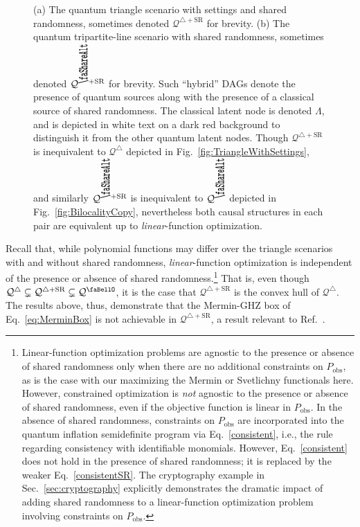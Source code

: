 \documentclass[superscriptaddress,aps,prx,nofootinbib,twocolumn,twoside,reprint,letterpaper,longbibliography]{revtex4-2}
\renewcommand{\bell}{\text{\faBellO}}
\renewcommand{\triangle}{\bigtriangleup}
\newcommand{\biloc}{\text{\scalebox{2}[1]{\rotatebox{90}{\faShareAlt}}}}
\begin{document}
\begin{figure}[b]
  \begin{center}
    \hfill
    \hfill
    \hfill
  \end{center}
  \caption{(a) The quantum triangle scenario with settings and shared randomness, sometimes denoted $\mathcal{Q}^{\triangle+\text{SR}}$ for brevity.
  (b) The quantum tripartite-line scenario with shared randomness, sometimes denoted $\mathcal{Q}^{{\protect\biloc}+\text{SR}}$ for brevity.
  Such ``hybrid'' DAGs denote the presence of quantum sources along with the presence of a classical source of shared randomness. The classical latent node is denoted $\Lambda$, and is depicted in white text on a dark red background to distinguish it from the other quantum latent nodes. Though $\mathcal{Q}^{\triangle+\text{SR}}$ is inequivalent to $\mathcal{Q}^\triangle$ depicted in Fig.~\ref{fig:TriangleWithSettings}, and similarly $\mathcal{Q}^{{\protect\biloc}+\text{SR}}$ is inequivalent to $\mathcal{Q}^{\protect\biloc}$ depicted in Fig.~\ref{fig:BilocalityCopy}, nevertheless both causal structures in each pair are equivalent up to \emph{linear}-function optimization.}
  \label{fig:SRDAGs}
\end{figure}

Recall that, while polynomial functions may differ over the triangle scenarios with and without shared randomness, \emph{linear}-function optimization is independent of the presence or absence of shared randomness.\footnote{Linear-function optimization problems are agnostic to the presence or absence of shared randomness only when there are no additional constraints on $P_\text{obs}$, as is the case with our maximizing the Mermin or Svetlichny functionals here.
However, constrained optimization is \emph{not} agnostic to the presence or absence of shared randomness, even if the objective function is linear in $P_\text{obs}$. In the absence of shared randomness, constraints on $P_\text{obs}$ are incorporated into the quantum inflation semidefinite program via Eq.~\eqref{consistent}, i.e., the rule regarding consistency with identifiable monomials. However, Eq.~\eqref{consistent} does not hold in the presence of shared randomness; it is replaced by the weaker Eq.~\eqref{consistentSR}. The cryptography example in Sec.~\ref{sec:cryptography} explicitly demonstrates the dramatic impact of adding shared randomness to a linear-function optimization problem involving constraints on $P_\text{obs}$.}
That is, even though $\mathcal{Q}^\triangle\subsetneq \mathcal{Q}^{\triangle+\text{SR}}\subsetneq \mathcal{Q}^{\bell}$, it is the case that $\mathcal{Q}^{\triangle+\text{SR}}$ is the convex hull of $\mathcal{Q}^\triangle$. The results above, thus, demonstrate that the Mermin-GHZ box of Eq.~\eqref{eq:MerminBox} is not achievable in $\mathcal{Q}^{\triangle+\text{SR}}$, a result relevant to Ref.~\cite{Schmid2020LOSR}.
\end{document}
